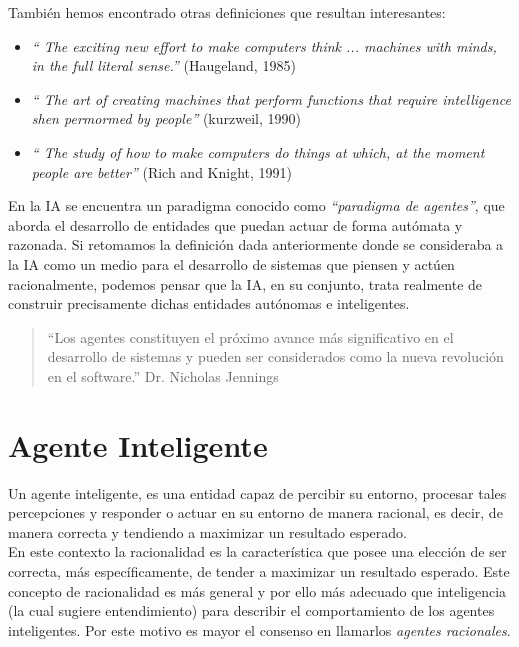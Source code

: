 \documentclass[a4paper,12pt,oneside]{book}
\begin{document}
También hemos encontrado otras definiciones que resultan interesantes:
\begin{itemize}
\item {\it `` The exciting new effort to make computers think ... machines
    with minds, in the full literal sense.''} (Haugeland, 1985)\\
\item {\it `` The art of creating machines that perform functions that
    require intelligence shen permormed by people''} (kurzweil, 1990)\\
\item {\it `` The study of how to make computers do things at which, at the
    moment people are better''} (Rich and Knight, 1991)\\
\end{itemize}
En la IA se encuentra un paradigma conocido como {\it ``paradigma de
  agentes''}, que aborda el desarrollo de entidades que puedan actuar
de forma autómata y razonada. Si retomamos la definición dada
anteriormente donde se consideraba a la IA como un medio para el
desarrollo de sistemas que piensen y actúen racionalmente, podemos
pensar que la IA, en su conjunto, trata realmente de construir
precisamente dichas entidades autónomas e inteligentes.
\begin{quote}
  ``Los agentes constituyen el próximo avance más significativo en el
  desarrollo de sistemas y pueden ser considerados como la nueva
  revolución en el software.''
  Dr. Nicholas Jennings
\end{quote}

\section{Agente Inteligente}
Un agente inteligente, es una entidad capaz de percibir su entorno,
procesar tales percepciones y responder o actuar en su entorno de
manera racional, es decir, de manera correcta y tendiendo a maximizar
un resultado esperado.\\

En este contexto la racionalidad es la característica que posee una
elección de ser correcta, más específicamente, de tender a maximizar
un resultado esperado. Este concepto de racionalidad es más general y
por ello más adecuado que inteligencia (la cual sugiere entendimiento)
para describir el comportamiento de los agentes inteligentes. Por este
motivo es mayor el consenso en llamarlos {\it agentes racionales}.\\
\end{document}
